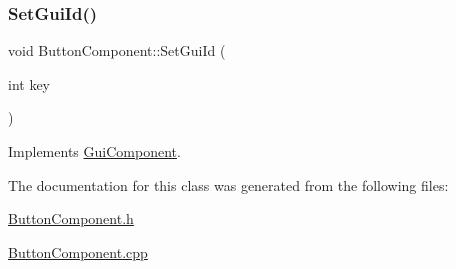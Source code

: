 \subsubsection{\texorpdfstring{SetGuiId()}{SetGuiId()}}
{\footnotesize\ttfamily void Button\+Component\+::\+Set\+Gui\+Id (\begin{DoxyParamCaption}\item[{int}]{key }\end{DoxyParamCaption})\hspace{0.3cm}{\ttfamily [virtual]}}



Implements \mbox{\hyperlink{class_gui_component_a27d0d28dbc048b7cd3ad63e8a1961021}{Gui\+Component}}.



The documentation for this class was generated from the following files\+:\begin{DoxyCompactItemize}
\item 
\mbox{\hyperlink{_button_component_8h}{Button\+Component.\+h}}\item 
\mbox{\hyperlink{_button_component_8cpp}{Button\+Component.\+cpp}}\end{DoxyCompactItemize}
